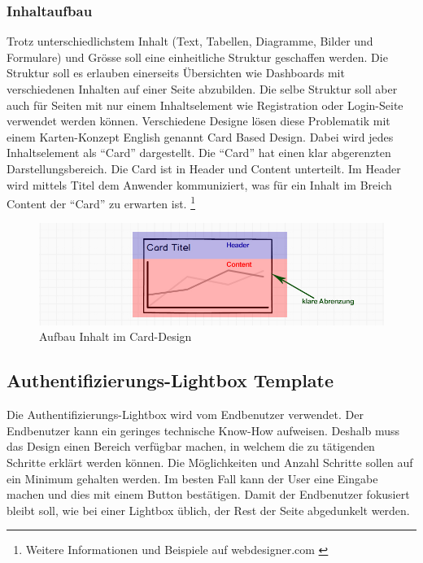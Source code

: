 \newpage

\subsubsection{Inhaltaufbau}\label{inhaltaufbau}

Trotz unterschiedlichstem Inhalt (Text, Tabellen, Diagramme, Bilder und
Formulare) und Grösse soll eine einheitliche Struktur geschaffen werden.
Die Struktur soll es erlauben einerseits Übersichten wie Dashboards mit
verschiedenen Inhalten auf einer Seite abzubilden. Die selbe Struktur
soll aber auch für Seiten mit nur einem Inhaltselement wie Registration
oder Login-Seite verwendet werden können. Verschiedene Designe lösen
diese Problematik mit einem Karten-Konzept English genannt Card Based
Design. Dabei wird jedes Inhaltselement als ``Card'' dargestellt. Die
``Card'' hat einen klar abgerenzten Darstellungsbereich. Die Card ist in
Header und Content unterteilt. Im Header wird mittels Titel dem Anwender
kommuniziert, was für ein Inhalt im Breich Content der ``Card'' zu
erwarten ist. \footnote{Weitere Informationen und Beispiele auf
  webdesigner.com \autocite{card-based-design}}

\begin{figure}[htbp]
\centering
\includegraphics{images/mockups/card.jpg}
\caption{Aufbau Inhalt im Card-Design}
\end{figure}

\newpage

\hypertarget{authentifizierungs-lightbox-template}{\subsection{Authentifizierungs-Lightbox
Template}\label{authentifizierungs-lightbox-template}}

Die Authentifizierungs-Lightbox wird vom Endbenutzer verwendet. Der
Endbenutzer kann ein geringes technische Know-How aufweisen. Deshalb
muss das Design einen Bereich verfügbar machen, in welchem die zu
tätigenden Schritte erklärt werden können. Die Möglichkeiten und Anzahl
Schritte sollen auf ein Minimum gehalten werden. Im besten Fall kann der
User eine Eingabe machen und dies mit einem Button bestätigen. Damit der
Endbenutzer fokusiert bleibt soll, wie bei einer Lightbox üblich, der
Rest der Seite abgedunkelt werden.

